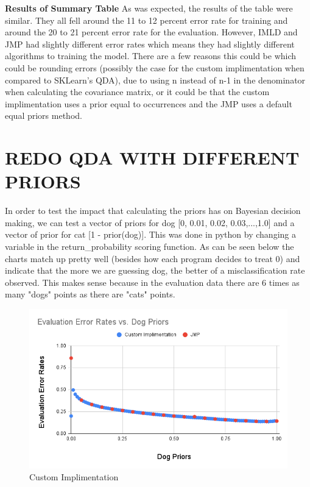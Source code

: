 \documentclass{article}
\begin{document}
\begin{flushleft}
\break
\textbf{Results of Summary Table}\break
\break
As was expected, the results of the table were similar. They all fell around the 11 to 12 percent error rate for training and around the 20 to 21 percent error rate for the evaluation. However, IMLD and JMP had slightly different error rates which means they had slightly different algorithms to training the model. There are a few reasons this could be which could be rounding errors (possibly the case for the custom implimentation when compared to SKLearn's QDA), due to using n instead of n-1 in the denominator when calculating the covariance matrix, or it could be that the custom implimentation uses a prior equal to occurrences and the JMP uses a default equal priors method.  
\section{\MakeUppercase{Redo QDA With Different Priors}}
In order to test the impact that calculating the priors has on Bayesian decision making, we can test a vector of priors for dog [0, 0.01, 0.02, 0.03,...,1.0] and a vector of prior for cat [1 - prior(dog)]. This was done in python by changing a variable in the return\_probability scoring function.\break
\break
As can be seen below the charts match up pretty well (besides how each program decides to treat 0) and indicate that the more we are guessing dog, the better of a misclassification rate observed. This makes sense because in the evaluation data there are 6 times as many "dogs" points as there are "cats" points.
\begin{figure}[!htb]
        \centering
        \begin{minipage}{0.8\textwidth}
                \centering
                \includegraphics[width=1\linewidth]{../Evaluation_Error_Rates_vs_Dog_Priors.png}
                \caption{Custom Implimentation}
        \end{minipage}
\end{figure}
\break
\end{flushleft}
\end{document}
